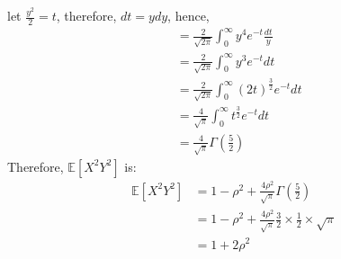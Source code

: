 \documentclass[a4paper]{article}
\begin{document}
let $\frac{y^2}{2} = t$, therefore, $dt = ydy$, hence,
 \begin{equation*}
	\begin{split}
		&= \frac{2}{\sqrt{2\pi} } \int_0^{\infty} y^{4} e^{-t} \frac{dt}{y}\\
		&= \frac{2}{\sqrt{2\pi} } \int_0^{\infty} y^{3} e^{-t} dt\\
		&= \frac{2}{\sqrt{2\pi} } \int_0^{\infty} \left( 2t \right) ^{\frac{3}{2}} e^{-t}dt\\
		&= \frac{4}{\sqrt{\pi} } \int_0^{\infty} t^{\frac{3}{2}} e^{-t}dt\\
		&= \frac{4}{\sqrt{\pi} } \Gamma\left( \frac{5}{2} \right) 
	\end{split}
\end{equation*}
Therefore, $\mathbb{E}\left[ X^2Y^2 \right] $ is:
\begin{equation*}
	\begin{split}
		\mathbb{E}\left[ X^2Y^2 \right] &=  1 - \rho^2 + \frac{4\rho^2}{\sqrt{\pi} } \Gamma\left( \frac{5}{2} \right)\\
		&=  1- \rho^2 + \frac{4\rho^2}{\sqrt{\pi} } \frac{3}{2}\times \frac{1}{2}\times \sqrt{\pi}\\
		&=  1 + 2\rho^2
	\end{split}
\end{equation*}
\end{document}
